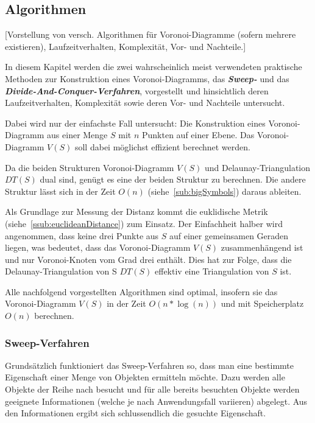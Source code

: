 \subsection{Algorithmen}
\label{sub:voronoiAlgorithms}
[Vorstellung von versch. Algorithmen für Voronoi-Diagramme (sofern mehrere existieren), Laufzeitverhalten, Komplexität, Vor- und Nachteile.]

In diesem Kapitel werden die zwei wahrscheinlich meist verwendeten praktische Methoden zur Konstruktion eines Voronoi-Diagramms, das \textit{\textbf{Sweep-}} und das \textit{\textbf{Divide-And-Conquer-Verfahren}}, vorgestellt und hinsichtlich deren Laufzeitverhalten, Komplexität sowie deren Vor- und Nachteile untersucht.

Dabei wird nur der einfachste Fall untersucht: Die Konstruktion eines Voronoi-Diagramm aus einer Menge $S$ mit $n$ Punkten auf einer Ebene. Das Voronoi-Diagramm $V(S)$ soll dabei möglichst effizient berechnet werden.

Da die beiden Strukturen Voronoi-Diagramm $V(S)$ und Delaunay-Triangulation $DT(S)$ dual sind, genügt es eine der beiden Struktur zu berechnen. Die andere Struktur lässt
sich in der Zeit $O(n)$ (siehe~\ref{sub:bigSymbols}) daraus ableiten.

Als Grundlage zur Messung der Distanz kommt die euklidische Metrik (siehe~\ref{ssub:euclideanDistance}) zum Einsatz. Der Einfachheit halber wird angenommen, dass keine drei Punkte aus $S$ auf einer gemeinsamen Geraden liegen, was bedeutet, dass das Voronoi-Diagramm $V(S)$ zusammenhängend ist und nur Voronoi-Knoten vom Grad drei enthält. Dies hat zur Folge, dass die Delaunay-Triangulation von S $DT(S)$ effektiv eine Triangulation von $S$ ist.

Alle nachfolgend vorgestellten Algorithmen sind optimal, insofern sie das Voronoi-Diagramm $V(S)$ in der Zeit $O(n * \log(n))$ und mit Speicherplatz $O(n)$ berechnen.

\subsubsection{Sweep-Verfahren}
\label{ssub:voronoiAlgorithmsSweep}
Grundsätzlich funktioniert das Sweep-Verfahren so, dass man eine bestimmte Eigenschaft einer Menge von Objekten ermitteln möchte. Dazu werden alle Objekte der Reihe nach besucht und für alle bereits besuchten Objekte werden geeignete Informationen (welche je nach Anwendungsfall variieren) abgelegt. Aus den Informationen ergibt sich schlussendlich die gesuchte Eigenschaft.

